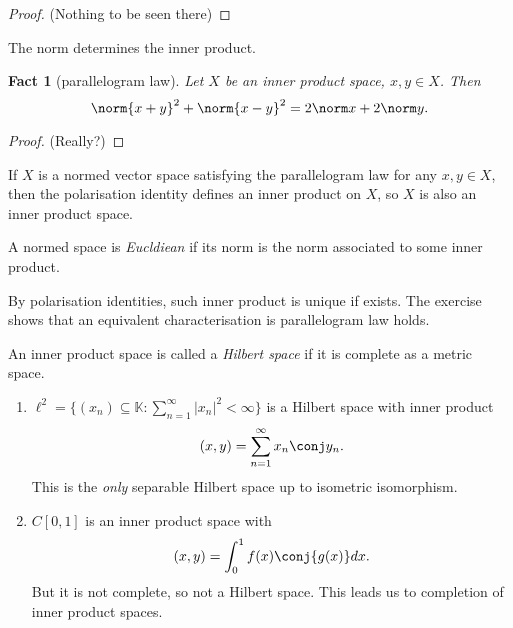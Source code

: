 \documentclass[a4paper]{article}
\newtheorem*{fact}{Fact}
\newcommand{\K}{{\mathbb{K}}} %
\begin{document}
\begin{proof}
  (Nothing to be seen there)
\end{proof}

\begin{corollary}
  The norm determines the inner product.
\end{corollary}

\begin{fact}[parallelogram law]
  Let \(X\) be an inner product space, \(x, y \in X\). Then
  \[
    \norm{x + y}^2 + \norm{x - y}^2 = 2 \norm x + 2 \norm y.
  \]
\end{fact}

\begin{proof}
  (Really?)
\end{proof}

\begin{ex}
  If \(X\) is a normed vector space satisfying the parallelogram law for any \(x, y \in X\), then the polarisation identity defines an inner product on \(X\), so \(X\) is also an inner product space.
\end{ex}

\begin{definition}[Euclidean]
  A normed space is \emph{Eucldiean} if its norm is the norm associated to some inner product.
\end{definition}

By polarisation identities, such inner product is unique if exists. The exercise shows that an equivalent characterisation is parallelogram law holds.

\begin{definition}
  An inner product space is called a \emph{Hilbert space} if it is complete as a metric space.
\end{definition}

\begin{eg}\leavevmode
  \begin{enumerate}
  \item \(\ell^2 = \{(x_n) \subseteq \K: \sum_{n = 1}^\infty |x_n|^2 < \infty\}\) is a Hilbert space with inner product
    \[
      (x, y) = \sum_{n = 1}^\infty x_n \conj y_n.
    \]
    This is the \emph{only} separable Hilbert space up to isometric isomorphism.
  \item \(C[0, 1]\) is an inner product space with
    \[
      (x, y) = \int_0^1 f(x) \conj{g(x)} dx.
    \]
    But it is not complete, so not a Hilbert space. This leads us to completion of inner product spaces.
  \end{enumerate}
\end{eg}
\end{document}
